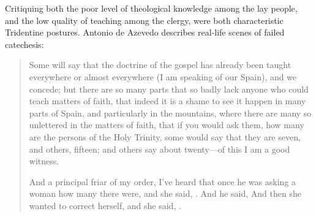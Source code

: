 Critiquing both the poor level of theological knowledge among the lay people, and the low quality of teaching among the clergy, were both characteristic Tridentine postures.%
    \Autocite[56-57]{Kamen:EarlyModernSociety}
Antonio de Azevedo describes real-life scenes of failed catechesis:
\begin{quotation}
    Some will say that the doctrine of the gospel has already been taught everywhere or almost everywhere (I am speaking of our Spain), and we concede;
    but there are so many parts that so badly lack anyone who could teach matters of faith,
    that indeed it is a shame to see it happen in many parts of Spain, and particularly in the  mountains,
    where there are many so unlettered  in the matters of faith,
    that if you would ask them, how many are the persons of the Holy Trinity, some would say that they are seven, and others, fifteen; and others say about twenty---of this I am a good witness.

    And a principal friar of my order, I've heard that once he was asking a woman how many  there were, and she said, .
    And he said, 
    And then she wanted to correct herself, and she said, .%
        \Autocite[26: .]
        {Azevedo:Catecismo}
\end{quotation}

